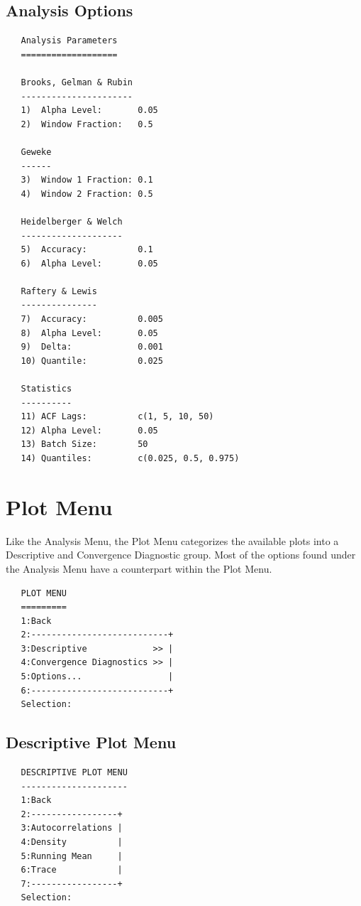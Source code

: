 \documentclass[12pt,letterpaper]{report}
\begin{document}
\section{Analysis Options}
\label{sec.analysispar}
\noindent

\vskip 9pt
\begin{tiny}
\begin{verbatim}
   Analysis Parameters
   ===================

   Brooks, Gelman & Rubin
   ----------------------
   1)  Alpha Level:       0.05
   2)  Window Fraction:   0.5

   Geweke
   ------
   3)  Window 1 Fraction: 0.1
   4)  Window 2 Fraction: 0.5

   Heidelberger & Welch
   --------------------
   5)  Accuracy:          0.1
   6)  Alpha Level:       0.05

   Raftery & Lewis
   ---------------
   7)  Accuracy:          0.005
   8)  Alpha Level:       0.05
   9)  Delta:             0.001
   10) Quantile:          0.025

   Statistics
   ----------
   11) ACF Lags:          c(1, 5, 10, 50)
   12) Alpha Level:       0.05
   13) Batch Size:        50
   14) Quantiles:         c(0.025, 0.5, 0.975)
\end{verbatim}
\end{tiny}

\chapter{Plot Menu}
\noindent
Like the Analysis Menu, the Plot Menu categorizes the available plots into a
Descriptive and Convergence Diagnostic group. Most of the options found under
the Analysis Menu have a counterpart within the Plot Menu.
\vskip 9pt
\begin{tiny}
\begin{verbatim}
   PLOT MENU
   =========
   1:Back
   2:---------------------------+
   3:Descriptive             >> |
   4:Convergence Diagnostics >> |
   5:Options...                 |
   6:---------------------------+
   Selection:
\end{verbatim}
\end{tiny}

\section{Descriptive Plot Menu}
\noindent

\vskip 9pt
\begin{tiny}
\begin{verbatim}
   DESCRIPTIVE PLOT MENU
   ---------------------
   1:Back
   2:-----------------+
   3:Autocorrelations |
   4:Density          |
   5:Running Mean     |
   6:Trace            |
   7:-----------------+
   Selection:
\end{verbatim}
\end{tiny}
\end{document}
